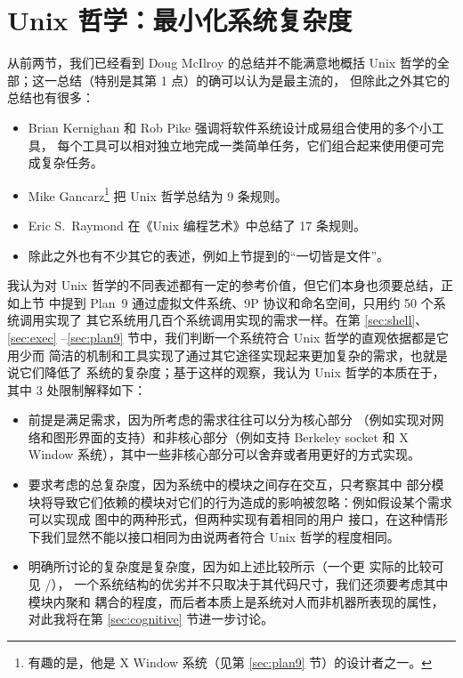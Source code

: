 \section{Unix 哲学：最小化系统复杂度}\label{sec:complex}

从前两节，我们已经看到 Doug McIlroy 的总结并不能满意地概括 Unix
哲学的全部；这一总结（特别是其第 1 点）的确可以认为是最主流的，
但除此之外其它的总结也有很多：
\begin{itemize}
\item Brian Kernighan 和 Rob Pike 强调将软件系统设计成易组合使用的多个小工具，
	每个工具可以相对独立地完成一类简单任务，它们组合起来使用便可完成复杂任务。
\item Mike Gancarz\footnote{有趣的是，他是 X Window 系统（见第
	\ref{sec:plan9} 节）的设计者之一。} 把 Unix 哲学总结为 9 条规则。
\item Eric S.\ Raymond 在《Unix 编程艺术》中总结了 17 条规则。
\item 除此之外也有不少其它的表述，例如上节提到的“一切皆是文件”。
\end{itemize}
我认为对 Unix 哲学的不同表述都有一定的参考价值，但它们本身也须要总结，正如上节
中提到 Plan~9 通过虚拟文件系统、9P 协议和命名空间，只用约 50 个系统调用实现了
其它系统用几百个系统调用实现的需求一样。在第 \ref{sec:shell}、\ref{sec:exec}%
--\ref{sec:plan9} 节中，我们判断一个系统符合 Unix 哲学的直观依据都是它用少而
简洁的机制和工具实现了通过其它途径实现起来更加复杂的需求，也就是说它们降低了
系统的复杂度；基于这样的观察，我认为 Unix 哲学的本质在于，其中 3 处限制解释如下：
\begin{itemize}
\item 前提是满足需求，因为所考虑的需求往往可以分为核心部分
	（例如实现对网络和图形界面的支持）和非核心部分（例如支持 Berkeley socket
	和 X Window 系统），其中一些非核心部分可以舍弃或者用更好的方式实现。
\item 要求考虑的总复杂度，因为系统中的模块之间存在交互，只考察其中
	部分模块将导致它们依赖的模块对它们的行为造成的影响被忽略：例如假设某个需求
	可以实现成 \parencite{litt2014a} 图中的两种形式，但两种实现有着相同的用户
	接口，在这种情形下我们显然不能以接口相同为由说两者符合 Unix 哲学的程度相同。
\item 明确所讨论的复杂度是复杂度，因为如上述比较所示（一个更
	实际的比较可见 \parencite{github:acmetiny}/\parencite{gitlab:emca}），
	一个系统结构的优劣并不只取决于其代码尺寸，我们还须要考虑其中模块内聚和
	耦合的程度，而后者本质上是系统对人而非机器所表现的属性，对此我将在第
	\ref{sec:cognitive} 节进一步讨论。
\end{itemize}

